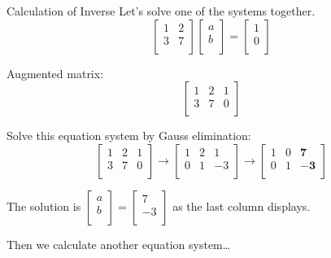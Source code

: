 \documentclass{beamer}
\begin{document}
\begin{frame}{Calculation of Inverse}
Let's solve one of the systems together.
\begin{equation*}
    \left[ \begin{matrix}
        1&		2\\
        3&		7\\
    \end{matrix} \right] \left[ \begin{array}{c}
        a\\
        b\\
    \end{array} \right] =\left[ \begin{array}{c}
        1\\
        0\\
    \end{array} \right]
\end{equation*}

Augmented matrix:
\begin{equation*}
    \left[ \begin{matrix}
        1&		2&		1\\
        3&		7&		0\\
    \end{matrix} \right]
\end{equation*}

Solve this equation system by Gauss elimination:
\begin{equation*}
    \left[ \begin{matrix}
        1&		2&		1\\
        3&		7&		0\\
    \end{matrix} \right] \rightarrow \left[ \begin{matrix}
        1&		2&		1\\
        0&		1&		-3\\
    \end{matrix} \right] \rightarrow \left[ \begin{matrix}
        1&		0&		\mathbf{7}\\
        0&		1&		\mathbf{-3}\\
    \end{matrix} \right]
\end{equation*}

The solution is $\left[ \begin{array}{c}
	a\\
	b\\
\end{array} \right] =\left[ \begin{array}{c}
	7\\
	-3\\
\end{array} \right] $ as the last column displays.

\vspace{3pt}
Then we calculate another equation system\dots


\end{frame}
\end{document}
